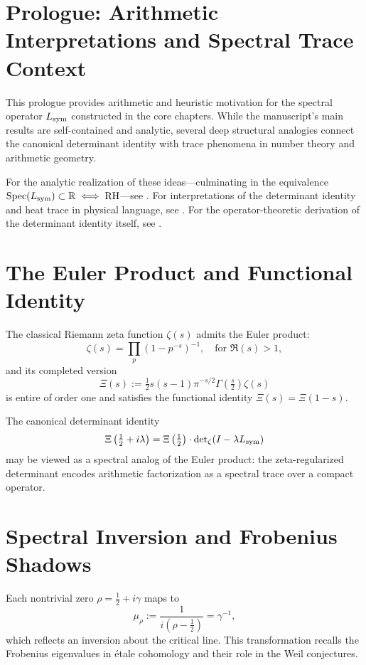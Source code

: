\section*{Prologue: Arithmetic Interpretations and Spectral Trace Context}

This prologue provides arithmetic and heuristic motivation for the spectral operator \( L_{\mathrm{sym}} \) constructed in the core chapters. While the manuscript’s main results are self-contained and analytic, several deep structural analogies connect the canonical determinant identity with trace phenomena in number theory and arithmetic geometry.

\medskip
\noindent
For the analytic realization of these ideas—culminating in the equivalence \( \operatorname{Spec}(L_{\mathrm{sym}}) \subset \mathbb{R} \iff \mathrm{RH} \)—see . For interpretations of the determinant identity and heat trace in physical language, see . For the operator-theoretic derivation of the determinant identity itself, see .

\section*{The Euler Product and Functional Identity}

The classical Riemann zeta function \( \zeta(s) \) admits the Euler product:
\[
\zeta(s) = \prod_p \left(1 - p^{-s} \right)^{-1}, \quad \text{for } \Re(s) > 1,
\]
and its completed version
\[
\Xi(s) := \tfrac{1}{2} s(s - 1) \pi^{-s/2} \Gamma\left( \tfrac{s}{2} \right) \zeta(s)
\]
is entire of order one and satisfies the functional identity \( \Xi(s) = \Xi(1 - s) \).

The canonical determinant identity
\[
\Xi\left( \tfrac{1}{2} + i\lambda \right) = \Xi\left( \tfrac{1}{2} \right) \cdot \det\nolimits_\zeta(I - \lambda L_{\mathrm{sym}})
\]
may be viewed as a spectral analog of the Euler product: the zeta-regularized determinant encodes arithmetic factorization as a spectral trace over a compact operator.

\section*{Spectral Inversion and Frobenius Shadows}

Each nontrivial zero \( \rho = \tfrac{1}{2} + i\gamma \) maps to
\[
\mu_\rho := \frac{1}{i(\rho - \tfrac{1}{2})} = \gamma^{-1},
\]
which reflects an inversion about the critical line. This transformation recalls the Frobenius eigenvalues in étale cohomology and their role in the Weil conjectures.

